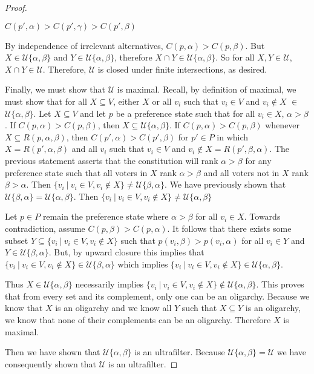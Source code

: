 \documentclass{amsart}
\theoremstyle{plain}
\begin{document}
\begin{proof}
\begin{center}
    $C(p', \alpha) > C(p', \gamma) > C(p', \beta)$
\end{center}

\noindent By independence of irrelevant alternatives, $C(p, \alpha) > C(p, \beta)$. But $X \in \mathcal{U}\{\alpha, \beta\}$ and $Y \in \mathcal{U}\{\alpha, \beta\}$, therefore $X \cap Y \in \mathcal{U}\{\alpha, \beta\}$. So for all $X, Y \in \mathcal{U}$, $X \cap Y \in \mathcal{U}$. Therefore, $\mathcal{U}$ is closed under finite intersections, as desired. 

Finally, we must show that $\mathcal{U}$ is maximal. Recall, by definition of maximal, we must show that for all $X \subseteq V$, either $X$ or all $v_i$ such that $v_i \in V$ and $v_i \notin X$ $\in$ $\mathcal{U}\{\alpha,\beta\}$. Let $X \subseteq V$ and let $p$ be a preference state such that for all $v_i \in X$, $\alpha > \beta$. If $C(p, \alpha) > C(p, \beta)$, then $X \subseteq \mathcal{U}\{\alpha, \beta\}$. If $C(p, \alpha) > C(p, \beta)$ whenever $X \subseteq R(p, \alpha, \beta)$, then $C(p', \alpha) > C(p', \beta)$ for $p' \in P$ in which $X = R(p', \alpha, \beta)$ and all $v_i$ such that $v_i \in V$ and $v_i \notin X = R(p', \beta, \alpha)$. The previous statement asserts that the constitution will rank $\alpha > \beta$ for any preference state such that all voters in $X$ rank $\alpha > \beta$ and all voters not in $X$ rank $\beta > \alpha$. Then $\{v_i \: | \: v_i \in V, v_i \notin X\} \ne \mathcal{U}\{\beta, \alpha\}$. We have previously shown that $\mathcal{U}\{\beta, \alpha\} = \mathcal{U}\{\alpha, \beta\}$. Then $\{v_i \: | \: v_i \in V, v_i \notin X\} \ne \mathcal{U}\{\alpha, \beta\}$

Let $p \in P$ remain the preference state where $\alpha > \beta$ for all $v_i \in X$. Towards contradiction, assume $C(p, \beta) > C(p, \alpha)$. It follows that there exists some subset $Y \subseteq \{v_i \: | \: v_i \in V, v_i \notin X\}$ such that $p(v_i, \beta) > p(v_i, \alpha)$ for all $v_i \in Y$ and $Y \in \mathcal{U}\{\beta, \alpha\}$. But, by upward closure this implies that $\{v_i \: | \: v_i \in V, v_i \notin X\} \in \mathcal{U}\{\beta, \alpha\}$ which implies  $\{v_i \: | \: v_i \in V, v_i \notin X\} \in \mathcal{U}\{\alpha, \beta\}$. 

Thus $X \in \mathcal{U}\{\alpha, \beta\}$ necessarily implies $\{v_i \: | \: v_i \in V, v_i \notin X\} \notin \mathcal{U}\{\alpha, \beta\}$. This proves that from every set and its complement, only one can be an oligarchy. Because we know that $X$ is an oligarchy and we know all $Y$ such that $X \subseteq Y$ is an oligarchy, we know that none of their complements can be an oligarchy. Therefore $X$ is maximal.

Then we have shown that $\mathcal{U}\{\alpha, \beta\}$ is an ultrafilter. Because $\mathcal{U}\{\alpha, \beta\} = \mathcal{U}$ we have consequently shown that $\mathcal{U}$ is an ultrafilter.
\end{proof}
\end{document}
